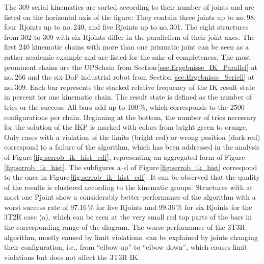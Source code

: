 \documentclass[robotics,article,accept,moreauthors,pdftex]{Definitions/mdpi}
\begin{document}
The 309 serial kinematics are sorted according to their number of  joints and are listed on the horizontal axis of the figure: They contain three  joints up to no.\,98, four R\replaced[id=Sp]{ }{-}joints up to no.\,240, and five R\replaced[id=Sp]{ }{-}joints up to no.\,301.
The eight structures from 302 to 309 with six R\replaced[id=Sp]{ }{-}joints differ in the parallelism of their joint axes.
The first 240 kinematic chains with more than one prismatic joint can be seen as a rather academic example and are listed for the sake of completeness.
The most prominent chains are the UPS\replaced[id=Sp]{ }{-}chain from Section\,\ref{sec:Ergebnisse_IK_Parallel} at no.\,266 and the six-DoF industrial robot from Section\,\ref{sec:Ergebnisse_Seriell} at no.\,309.
Each bar represents the stacked relative frequency of the IK result state in percent for one kinematic chain.
The result state is defined as the number of tries or the success.
All bars add up to 100\,\%, which corresponds to the 2500 configurations per chain.
Beginning at the bottom, the number of tries necessary for the solution of the IKP is marked with colors from bright green to orange.
Only cases with a violation of the limits (bright red) or wrong position (dark red) correspond to a failure of the algorithm, which has been addressed in the analysis of Figure\,\ref{fig:serrob_ik_hist_cdf}, representing an aggregated form of Figure\,\ref{fig:serrob_ik_hist}.
The subfigures a--d of Figure\,\ref{fig:serrob_ik_hist} correspond to the ones in Figure\,\ref{fig:serrob_ik_hist_cdf}.
It can be observed that the quality of the results is clustered according to the kinematic groups.
Structures with at most one P\replaced[id=Sp]{ }{-}joint show a considerably better performance of the algorithm with a worst success rate of 97.16\,\% for five R\replaced[id=Sp]{ }{-}joints %
and 99.36\,\% for six R\replaced[id=Sp]{ }{-}joints %
for the 3T2R case (a), which can be seen at the very small red top parts of the bars in the corresponding range of the diagram.
The worse performance of the 3T3R algorithm, mostly caused by limit violations, can be explained by joints changing their configuration, i.e., from ``elbow up'' to ``elbow down'', which causes limit violations but does not affect the 3T3R IK.
\end{document}
